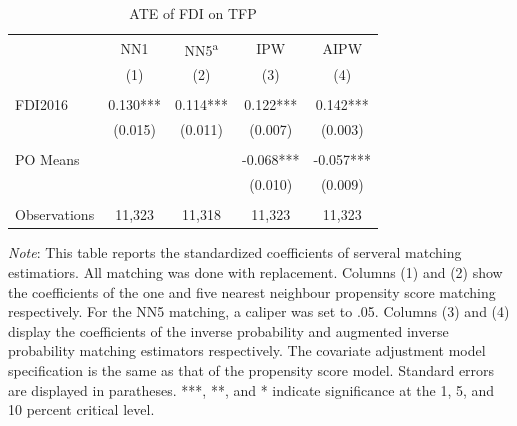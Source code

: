 \documentclass[a4paper,11pt]{scrartcl}
\begin{document}
\begin{table}[h!]
 	\centering
   	\caption{ATE of FDI on TFP}
   	\label{tab:mainresults}
\begin{threeparttable}
	
 \begin{tabular}{l*{4}{c}}
	\hline
	\hline
 			& NN1 & NN5\textsuperscript{a} & IPW & AIPW \\
 			& (1) & (2) & (3)  & (4) \\ \hline
 			&  &  &  &    \\
FDI2016 	& 0.130*** & 0.114*** & 0.122***  & 0.142***   \\
 			& (0.015) & (0.011) & (0.007) &   (0.003)  \\
 	&  &  &  &    \\
PO Means 	& & & -0.068*** &  -0.057*** \\
			&  &  & (0.010)  &  (0.009) \\
			&  &  &  &    \\
 Observations & 11,323 & 11,318 & 11,323 & 11,323 \\ 
 	\hline
 	\hline 
\end{tabular}

\begin{tablenotes}[flushleft]
      \footnotesize
\item \textit{Note}: %
This table reports the standardized coefficients of serveral matching estimatiors. All matching was done with replacement. Columns (1) and (2) show the coefficients of the one and five nearest neighbour propensity score matching respectively. For the NN5 matching, a caliper was set to .05. Columns (3) and (4) display the coefficients of the inverse probability and augmented inverse probability matching estimators respectively. The covariate adjustment model specification is the same as that of the propensity score model. Standard errors are displayed in paratheses. ***, **, and * indicate significance at the 1, 5, and 10 percent critical level.

\end{tablenotes}

\end{threeparttable}
\end{table}
\end{document}
